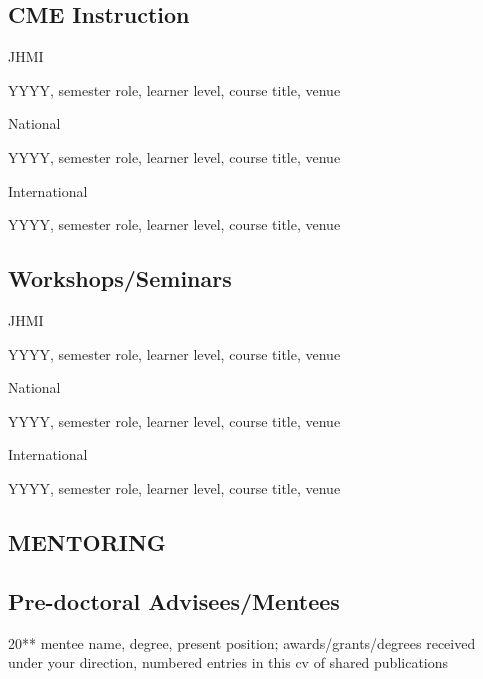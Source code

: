 \documentclass[11pt]{article}
\newenvironment{lyxlist}[1]
	{\begin{list}{}
		{\setlength\itemsep{-0.5ex}
		\settowidth{\labelwidth}{#1}
		 \setlength{\leftmargin}{\labelwidth}
		 \addtolength{\leftmargin}{\labelsep}
		 \renewcommand{\makelabel}[1]{##1\hfil}}}
	{\end{list}}
\begin{document}
\subsection*{CME Instruction}
\begin{lyxlist}{2020 (Winter, virtual)}

\item[{\textcolor{color1}{JHMI}}]

\item[{YYYY, semester}]role, learner level, course title, venue

\item[{\textcolor{color1}{National}}]

\item[{YYYY, semester}]role, learner level, course title, venue

\item[{\textcolor{color1}{International}}]
\item[{YYYY, semester}]role, learner level, course title, venue

\end{lyxlist}

\subsection*{Workshops/Seminars}
\begin{lyxlist}{2020 (Winter, virtual)}

\item[{\textcolor{color1}{JHMI}}]

\item[{YYYY, semester}]role, learner level, course title, venue

\item[{\textcolor{color1}{National}}]

\item[{YYYY, semester}]role, learner level, course title, venue

\item[{\textcolor{color1}{International}}]
\item[{YYYY, semester}]role, learner level, course title, venue

\end{lyxlist}

\subsection*{MENTORING}
\subsection*{Pre-doctoral Advisees/Mentees}
\begin{lyxlist}{20{*}{*}\textendash 20{*}{*}}
\item[{20{*}{*}\textendash 20{*}{*}}]mentee name, degree, present position; awards/grants/degrees received under your direction, numbered entries in this cv of shared publications
\end{lyxlist}
\end{document}
